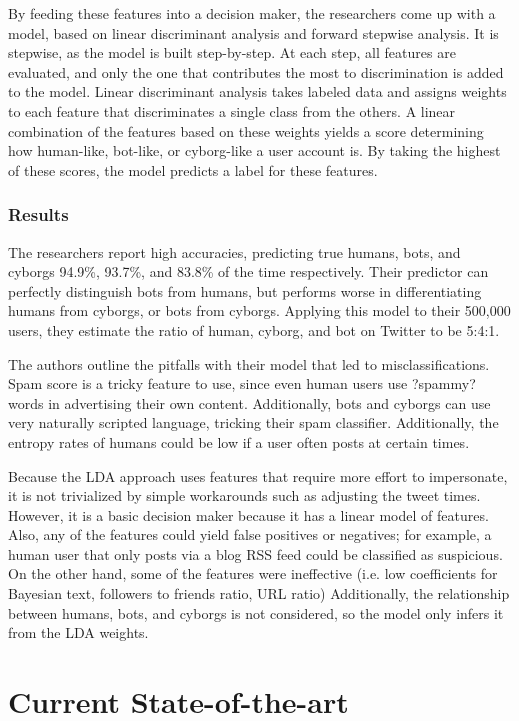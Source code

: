 \documentclass[11pt, oneside]{article}   	%
\begin{document}
\quad By feeding these features into a decision maker, the researchers come up with a model, based on linear discriminant analysis and forward stepwise analysis.
It is stepwise, as the model is built step-by-step.
At each step, all features are evaluated, and only the one that contributes the most to discrimination is added to the model.
Linear discriminant analysis takes labeled data and assigns weights to each feature that discriminates a single class from the others.
A linear combination of the features based on these weights yields a score determining how human-like, bot-like, or cyborg-like a user account is.
By taking the highest of these scores, the model predicts a label for these features.

\subsubsection*{Results}

\quad The researchers report high accuracies, predicting true humans, bots, and cyborgs 94.9\%, 93.7\%, and 83.8\% of the time respectively.
Their predictor can perfectly distinguish bots from humans, but performs worse in differentiating humans from cyborgs, or bots from cyborgs.
Applying this model to their 500,000 users, they estimate the ratio of human, cyborg, and bot on Twitter to be 5:4:1.

\quad The authors outline the pitfalls with their model that led to misclassifications.
Spam score is a tricky feature to use, since even human users use ?spammy? words in advertising their own content.
Additionally, bots and cyborgs can use very naturally scripted language, tricking their spam classifier.
Additionally, the entropy rates of humans could be low if a user often posts at certain times.

\quad Because the LDA approach uses features that require more effort to impersonate, it is not trivialized by simple workarounds such as adjusting the tweet times.
However, it is a basic decision maker because it has a linear model of features.
Also, any of the features could yield false positives or negatives; for example, a human user that only posts via a blog RSS feed could be classified as suspicious.
On the other hand, some of the features were ineffective (i.e. low coefficients for Bayesian text, followers to friends ratio, URL ratio)
Additionally, the relationship between humans, bots, and cyborgs is not considered, so the model only infers it from the LDA weights.

\section*{Current State-of-the-art}
\end{document}
